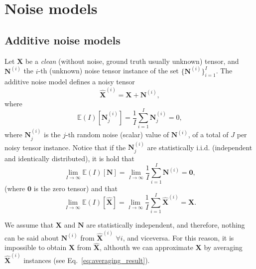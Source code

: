 \documentclass{article}
\begin{document}
\section{Noise models}
\label{sec:noise_models}

\subsection{Additive noise models}

Let $\mathbf{X}$ be a \emph{clean} (without noise, ground truth
usually unknown) tensor, and ${\mathbf N}^{(i)}$ the $i$-th (unknown)
noise tensor instance of the set $\{{\mathbf N}^{(i)}\}_{i=1}^I$. The
additive noise model defines a noisy tensor
\begin{equation}
  \hat{\mathbf X}^{(i)} = {\mathbf X} + {\mathbf N}^{(i)},
  \label{eq:additive_noisy_model}
\end{equation}
where
\begin{equation}
  {\mathbb E}(I)[{\mathbf N}^{(i)}_j]=\frac{1}{I} \sum_{i=1}^I {\mathbf N}_j^{(i)}=0,
  \label{eq:noise_expectation}
\end{equation}
where ${\mathbf N}^{(i)}_j$ is the $j$-th random noise (scalar) value
of ${\mathbf N}^{(i)}$, of a total of $J$ per noisy tensor
instance. Notice that if the ${\mathbf N}^{(i)}_j$ are
statistically i.i.d. (independent and identically distributed), it is
hold that
\begin{equation}
  \lim_{I \to \infty}{\mathbb E}(I)[{\mathbf N}]=\lim_{I \to \infty}\frac{1}{I} \sum_{i=1}^I {\mathbf N}^{(i)}={\mathbf 0},
  \label{eq:noise_expectation_2}
\end{equation}
(where ${\mathbf 0}$ is the zero tensor) and that
\begin{equation}
  \lim_{I \to \infty} \mathbb{E}(I)\left[\hat{\mathbf X}\right] = \lim_{I \to \infty} \frac{1}{I} \sum_{i=1}^I \hat{\mathbf X}^{(i)} = {\mathbf X}.
  \label{eq:averaging_result}
\end{equation}

We assume that ${\mathbf X}$ and $\mathbf{N}$ are statistically
independent, and therefore, nothing can be said about
${\mathbf N}^{(i)}$ from $\hat{\mathbf X}^{(i)}$ $\forall i$, and
viceversa. For this reason, it is impossible to obtain ${\mathbf X}$
from $\hat{\mathbf X}$, althouth we can approximate ${\mathbf X}$ by
averaging $\hat{\mathbf X}^{(i)}$ instances (see
Eq.~\ref{eq:averaging_result}).
\end{document}
